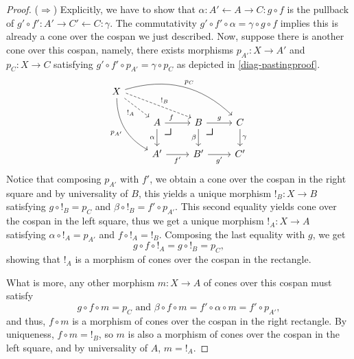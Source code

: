 \documentclass{article}
\theoremstyle{definition}
\theoremstyle{remark}
\newcommand{\pullback}{\mbox{\LARGE$\lrcorner$}}
\begin{document}
\begin{proof}
    ($\Rightarrow$) Explicitly, we have to show that $\alpha : A' \leftarrow A \rightarrow C : g \circ f$ is the pullback of $g' \circ f' : A' \rightarrow C' \leftarrow C:\gamma$. The commutativity $g'\circ f' \circ \alpha = \gamma \circ g \circ f$ implies this is already a cone over the cospan we just described. Now, suppose there is another cone over this cospan, namely, there exists morphisms $p_{A'}: X \rightarrow A'$ and $p_C: X \rightarrow C$ satisfying $g'\circ f' \circ p_{A'} = \gamma \circ p_C$ as depicted in \eqref{diag-pastingproof}.
    \begin{equation}\label{diag-pastingproof}
        \begin{tikzcd}
            X \arrow[rrrd, "p_C", bend left] \arrow[rdd, "p_{A'}"', bend right] \arrow[rrd, "!_B", dashed, shift left] \arrow[rd, "!_A"', dashed] & & & \\
            & A \arrow[r, near start, "f"] \arrow[d, "\alpha"'] \arrow[rd, "\pullback", phantom, very near start] & B \arrow[r, "g"] \arrow[d, "\beta"'] \arrow[rd, "\pullback", phantom, very near start] & C \arrow[d, "\gamma"] \\
            & A' \arrow[r, "f'"'] & B' \arrow[r, "g'"'] & C'
        \end{tikzcd}
    \end{equation}
    Notice that composing $p_{A'}$ with $f'$, we obtain a cone over the cospan in the right square and by universality of $B$, this yields a unique morphism $!_B: X \rightarrow B$ satisfying $g \circ !_B = p_C$ and $\beta \circ !_B = f' \circ p_{A'}$. This second equality yields cone over the cospan in the left square, thus we get a unique morphism $!_A : X \rightarrow A$ satisfying $\alpha \circ !_A = p_{A'}$ and $f \circ !_A = !_B$. Composing the last equality with $g$, we get
    \[g \circ f \circ !_A = g \circ !_B = p_C,\]
    showing that $!_A$ is a morphism of cones over the cospan in the rectangle.

    What is more, any other morphism $m: X \rightarrow A$ of cones over this cospan must satisfy
    \[g \circ f \circ m = p_C \text{ and } \beta \circ f \circ m = f' \circ \alpha \circ m = f' \circ p_{A'},\]
    and thus, $f\circ m$ is a morphism of cones over the cospan in the right rectangle. By uniqueness, $f\circ m = !_B$, so $m$ is also a morphism of cones over the cospan in the left square, and by universality of $A$, $m = !_A$.
    

\end{proof}
\end{document}
